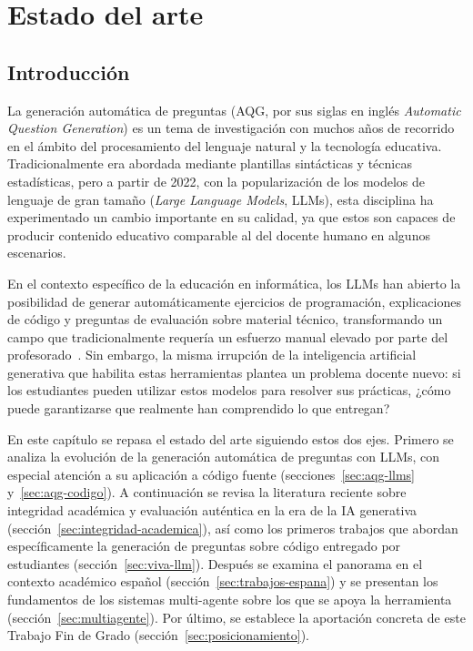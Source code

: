 \chapter{Estado del arte}
\label{cap:estado-arte}



\section{Introducción}
\label{sec:estado-arte-intro}

La generación automática de preguntas (AQG, por sus siglas en inglés
\emph{Automatic Question Generation}) es un tema de investigación con
muchos años de recorrido en el ámbito del procesamiento del lenguaje natural y
la tecnología educativa. Tradicionalmente era abordada mediante plantillas
sintácticas y técnicas estadísticas, pero a partir de 2022, con la popularización de los modelos de lenguaje de gran tamaño (\emph{Large Language Models}, LLMs), esta disciplina ha experimentado un cambio importante en su calidad, ya que estos son capaces de producir contenido educativo comparable al del docente humano
en algunos escenarios.

En el contexto específico de la educación en informática, los LLMs han
abierto la posibilidad de generar automáticamente ejercicios de
programación, explicaciones de código y preguntas de evaluación sobre
material técnico, transformando un campo que tradicionalmente requería un
esfuerzo manual elevado por parte del profesorado~\parencite{raihan2025llmcse}.
Sin embargo, la misma irrupción de la inteligencia artificial generativa
que habilita estas herramientas plantea un problema docente nuevo: si los
estudiantes pueden utilizar estos modelos para resolver sus prácticas, ¿cómo
puede garantizarse que realmente han comprendido lo que entregan?

En este capítulo se repasa el estado del arte siguiendo estos dos ejes.
Primero se analiza la evolución de la generación automática de preguntas
con LLMs, con especial atención a su aplicación a código fuente
(secciones~\ref{sec:aqg-llms} y~\ref{sec:aqg-codigo}). A continuación se
revisa la literatura reciente sobre integridad académica y evaluación
auténtica en la era de la IA generativa (sección~\ref{sec:integridad-academica}),
así como los primeros trabajos que abordan específicamente la generación de
preguntas sobre código entregado por estudiantes
(sección~\ref{sec:viva-llm}). Después se examina el panorama en el
contexto académico español (sección~\ref{sec:trabajos-espana}) y se
presentan los fundamentos de los sistemas multi-agente sobre los que se
apoya la herramienta (sección~\ref{sec:multiagente}). Por último, se
establece la aportación concreta de este Trabajo Fin de Grado
(sección~\ref{sec:posicionamiento}).


